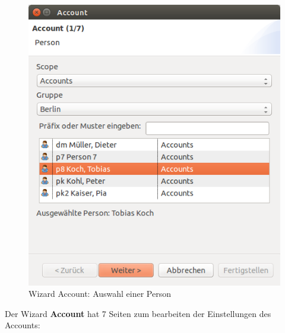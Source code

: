 \documentclass[a4paper,10pt]{book}
\begin{document}
\begin{figure}[htb!]
  \centering
  \includegraphics[scale=.345]{Screenshot/account_wizard-person_page.png}
  \caption{\label{Wizard Account: Auswahl einer Person} Wizard Account: Auswahl einer Person}
\end{figure}

Der Wizard \textbf{Account} hat 7 Seiten zum bearbeiten der Einstellungen des Accounts:
\end{document}
